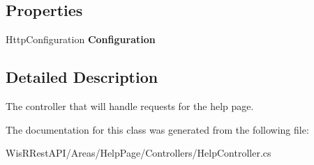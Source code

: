 \subsection*{Properties}
\begin{DoxyCompactItemize}
\item 
\hypertarget{class_wis_r_rest_a_p_i_1_1_areas_1_1_help_page_1_1_controllers_1_1_help_controller_a6a79a8d065f7c8203ddc74548ce5c156}{}Http\+Configuration {\bfseries Configuration}\label{class_wis_r_rest_a_p_i_1_1_areas_1_1_help_page_1_1_controllers_1_1_help_controller_a6a79a8d065f7c8203ddc74548ce5c156}

\end{DoxyCompactItemize}


\subsection{Detailed Description}
The controller that will handle requests for the help page. 



The documentation for this class was generated from the following file\+:\begin{DoxyCompactItemize}
\item 
Wis\+R\+Rest\+A\+P\+I/\+Areas/\+Help\+Page/\+Controllers/Help\+Controller.\+cs\end{DoxyCompactItemize}
